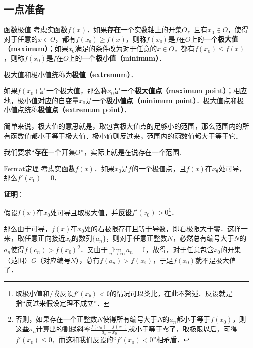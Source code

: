 

\subsection{一点准备}

\begin{definition}{函数极值}
考虑实函数$f(x)$．如果\textbf{存在}一个实数轴上的开集$O$，且有$x_0\in O$，使得对于任意的$x\in O$，都有$f(x_0)\geq f(x)$，则称$f(x_0)$是$f$在$O$上的一个\textbf{极大值（maximum）}；如果$x_0$满足的条件改为对于任意的$x\in O$，都有$f(x_0)\leq f(x)$，则称$f(x_0)$是$f$在$O$上的一个\textbf{极小值（minimum）}．

极大值和极小值统称为\textbf{极值（extremum）}．

如果$f(x_0)$是一个极大值，那么称$x_0$是一个\textbf{极大值点（maximum point）}；相应地，极小值对应的自变量$x_0$是一个\textbf{极小值点（minimum point）}．极大值点和极小值点统称\textbf{极值点（extremum point）}．
\end{definition}


简单来说，极大值的意思就是，取包含极大值点的足够小的范围，那么范围内的所有函数值都小于等于极大值．极小值则反过来，范围内的函数值都大于等于它．

我们要求“\textbf{存在}一个开集$O$”，实际上就是在说存在一个范围．


\begin{theorem}{Fermat定理}
考虑实函数$f(x)$．如果$x_0$是$f$的一个极值点，且$f(x)$在$x_0$处可导，那么$f'(x_0)=0$．
\end{theorem}

\textbf{证明}：

假设$f(x)$在$x_0$处可导且取极大值，并\textbf{反设}$f'(x_0)>0$\footnote{取极小值和/或反设$f'(x_0)<0$的情况可以类比，在此不赘述．反设就是指“反过来假设定理不成立”．}．

那么由于可导，$f(x)$在$x_0$处的右极限存在且等于导数，即右极限大于零．这样一来，取任意正向接近$x_0$的数列$\{a_n\}$，则对于任意正整数$N$，必然总有编号大于$N$的$a_n$使得$f(a_n)>f(x_0)$\footnote{否则，如果存在一个正整数$N$使得所有编号大于$N$的$a_n$都小于等于$f(x_0)$，则这些$a_n$计算出的割线斜率$\frac{f(a_n)-f(x_0)}{a_n-x_0}$就小于等于零了，取极限以后，可得$f'(x_0)\leq 0$，而这和我们反设的“$f'(x_0)<0$”相矛盾．}．又由于$\lim\limits_{n\to\infty}a_n=0$，故得，对于任意包含$x_0$的开集（范围）$O$（对应编号$N$），总有$f(a_n)>f(x_0)$，于是$f(x_0)$就不是极大值了．

